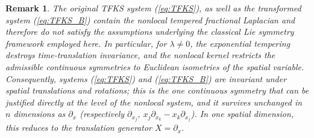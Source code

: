 \documentclass{article}
\newtheorem{remark}[theorem]{Remark}
\begin{document}
\begin{remark} 
The original TFKS system (\ref{eq:TFKS}), as well as the transformed system (\ref{eq:TFKS_B}) contain the nonlocal tempered fractional Laplacian and therefore do not satisfy the assumptions underlying the classical Lie symmetry framework employed here. In particular, for $\lambda\neq0$, the exponential tempering destroys time-translation invariance, and the nonlocal kernel restricts the admissible continuous symmetries to Euclidean isometries of the spatial variable. Consequently, systems (\ref{eq:TFKS}) and (\ref{eq:TFKS_B}) are invariant under spatial translations and rotations; this is the one continuous symmetry that can be justified directly at the level of the nonlocal system, and it survives unchanged in $n$ dimensions as $\partial_x$ (respectively $\partial_{x_j}$, $ x_j\partial_{x_k}-x_k\partial_{x_j}$). In one spatial dimension, this reduces to the translation generator $X=\partial_x$. 
\label{remark:3.1}
\end{remark}



\end{document}
